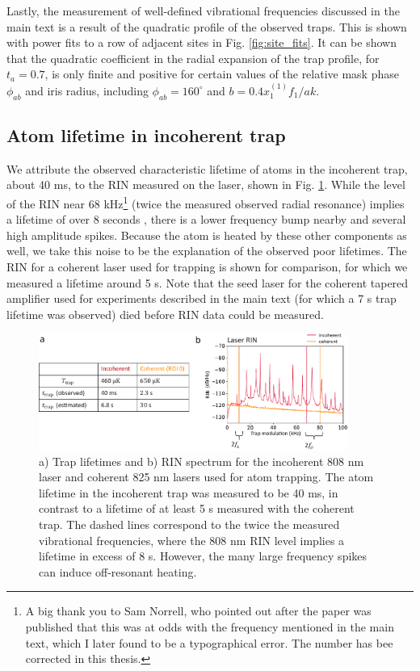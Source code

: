 Lastly, the measurement of well-defined vibrational frequencies discussed in the main text is a result of the quadratic profile of the observed traps. This is shown with power fits to a row of adjacent sites in Fig. \ref{fig:site_fits}. It can be shown that the quadratic coefficient in the radial expansion of the trap profile, for $t_a=0.7$, is only finite and positive for certain values of the relative mask phase $\phi_{ab}$ and iris radius, including $\phi_{ab}=160^{\circ}$ and $b=0.4x^{(1)}_1 f_1/a k$.

\subsection{Atom lifetime in incoherent trap}\label{sub:lifetime}
We attribute the observed characteristic lifetime of atoms in the incoherent trap, about 40 ms, to the RIN measured on the laser, shown in Fig. \ref{fig:rin}. While the level of the RIN near 68 kHz\footnote{A big thank you to Sam Norrell, who pointed out after the paper was published that this was at odds with the frequency mentioned in the main text, which I later found to be a typographical error. The number has bee corrected  in this thesis.} (twice the measured observed radial resonance) implies a lifetime of over 8 seconds \cite{Gehm1998}, there is a lower frequency bump nearby and several high amplitude spikes. Because the atom is heated by these other components as well, we take this noise to be the explanation of the observed poor lifetimes.
The RIN for a coherent laser used for trapping is shown for comparison, for which we measured a lifetime around 5 s. Note that the seed laser for the coherent tapered amplifier used for experiments described in the main text (for which a 7 s trap lifetime was observed) died before RIN data could be measured. 

\begin{figure}[t!]
    \centering
    \includegraphics[width=0.9\textwidth]{Images/trap_array_frequencies_and_lifetimes.pdf}
    \caption{a) Trap lifetimes and b) RIN spectrum for the incoherent 808 nm laser and coherent 825 nm lasers used for atom trapping. The  atom lifetime in the incoherent trap was measured to be 40 ms, in contrast to a lifetime of at least 5 s measured with the coherent trap. The dashed lines correspond to the twice the measured vibrational frequencies, where the 808 nm RIN level implies a lifetime in excess of 8 s. However, the many large frequency spikes can induce off-resonant heating.}
    \label{fig:rin}
\end{figure}


